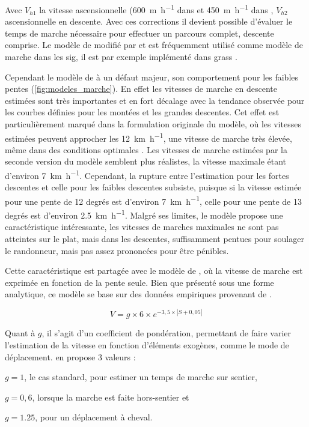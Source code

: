 Avec \(V_{h1}\) la vitesse ascensionnelle (\SI{600}{\meter\per\hour}
dans \textcite{Langmuir1984} et \SI{450}{\meter\per\hour} dans
\textcite{Langmuir2013}, \(V_{h2}\) ascensionnelle en descente. Avec
ces corrections il devient possible d'évaluer le temps de marche
nécessaire pour effectuer un parcours complet, descente comprise. Le
modèle de \textcite{Naismith1892} modifié par \textcite{Aitken1977} et
\textcite{Langmuir1984} est fréquemment utilisé comme modèle de marche
dans les \ac{sig}, il est par exemple implémenté dans grass
\autocite{Grass2020}.

Cependant le modèle de  à un défaut majeur, son
comportement pour les faibles pentes
(\autoref{fig:modeles_marche}). En effet les vitesses de marche en
descente estimées sont très importantes et en fort décalage avec la
tendance observée pour les courbes définies pour les montées et les
grandes descentes. Cet effet est particulièrement marqué dans la
formulation originale du modèle, où les vitesses estimées peuvent
approcher les \SI{12}{\kilo\meter\per\hour}, une vitesse de marche
très élevée, même dans des conditions optimales
\autocite{Kerouanton2020}. Les vitesses de marche estimées par la
seconde version du modèle \autocite{Langmuir2013} semblent plus
réalistes, la vitesse maximale étant d'environ
\SI{7}{\kilo\meter\per\hour}. Cependant, la rupture entre l'estimation
pour les fortes descentes et celle pour les faibles descentes
subsiste, puisque si la vitesse estimée pour une pente de 12 degrés
est d'environ \SI{7}{\kilo\meter\per\hour}, celle pour une pente de 13
degrés est d'environ \SI{2,5}{\kilo\meter\per\hour}. Malgré ses
limites, le modèle  propose une caractéristique
intéressante, les vitesses de marches maximales ne sont pas atteintes
sur le plat, mais dans les descentes, suffisamment pentues pour
soulager le randonneur, mais pas assez prononcées pour être pénibles.

Cette caractéristique est partagée avec le modèle de
\textcite{Tobler1993}, où la vitesse de marche est exprimée en
fonction de la pente seule. Bien que présenté sous une forme
analytique, ce modèle se base sur des données empiriques provenant de
\textcite{Imhof1950} \autocite{Tobler1993}.

\begin{equation}
  \label{eq:marche_tobler}
  V = g × 6 × e^{-3,5 × \left| S + 0,05 \right|}
\end{equation}

Quant à \(g\), il s'agit d'un coefficient de
pondération, permettant de faire varier l'estimation de la vitesse en
fonction d'éléments exogènes, comme le mode de
déplacement. \textcite{Tobler1993} en propose 3 valeurs :
%
\begin{enumerate*}[label=(\alph*)]
\item \(g = 1\), le cas standard, pour estimer un temps de marche sur
  sentier,
\item \(g = 0,6\), lorsque la marche est faite hors-sentier et
\item  \(g = 1.25\), pour un déplacement à cheval.
\end{enumerate*}

